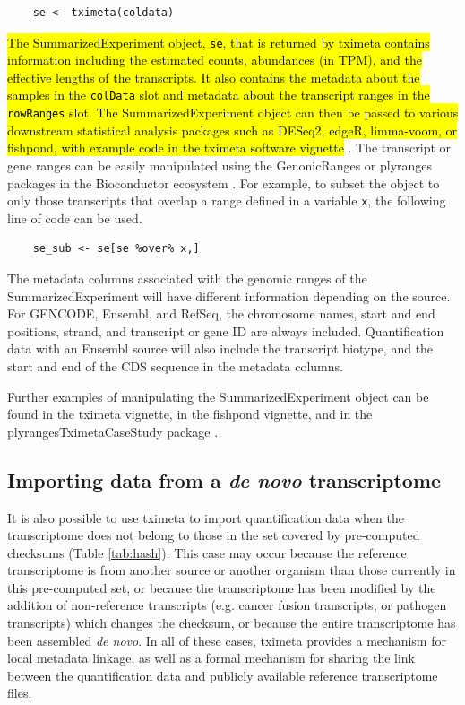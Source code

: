 \begin{verbatim}
    se <- tximeta(coldata)
\end{verbatim}

\hl{The SummarizedExperiment object, \texttt{se}, that is returned by
tximeta contains information including the estimated counts,
abundances (in TPM), and the effective lengths of the transcripts.
It also contains the metadata about the samples in the
\texttt{colData} slot and metadata about the transcript ranges in the
\texttt{rowRanges} slot.
The SummarizedExperiment object can then be passed to various
downstream statistical analysis packages such as DESeq2, edgeR,
limma-voom, or fishpond, with example code in the tximeta software
vignette} \cite{deseq2,edger,limma,voom,swish}. The
transcript or gene ranges can be easily manipulated using the
GenonicRanges or plyranges packages in the Bioconductor ecosystem
\cite{granges,Lee2019}. For example, to subset the object to only
those transcripts that overlap a range defined in a variable
\texttt{x}, the following line of code can be used.

\begin{verbatim}
    se_sub <- se[se %over% x,]
\end{verbatim}

The metadata columns associated with the genomic ranges of the
SummarizedExperiment will have different information depending on the
source. For GENCODE, Ensembl, and RefSeq, the chromosome names, start
and end positions, strand, and transcript or gene ID are always
included. Quantification data with an Ensembl source will also include
the transcript biotype, and the start and end of the CDS sequence in
the metadata columns.

Further examples of manipulating the SummarizedExperiment object can
be found in the tximeta vignette, in the fishpond vignette, and in the
plyrangesTximetaCaseStudy package \cite{casestudy}.

\subsection*{Importing data from a \textit{de novo} transcriptome}

It is also possible to use tximeta to import quantification data when
the transcriptome does not belong to those in the set covered by pre-computed
checksums (Table \ref{tab:hash}). This case may occur because the
reference transcriptome is from another source or another organism
than those currently in this pre-computed set, or because the
transcriptome has been modified by the addition of non-reference
transcripts (e.g. cancer fusion transcripts, or pathogen transcripts)
which changes the checksum, or because the entire transcriptome has
been assembled \textit{de novo}. In all of these cases, tximeta
provides a mechanism for local metadata linkage, as well as a formal
mechanism for sharing the link between the quantification data and
publicly available reference transcriptome files.

